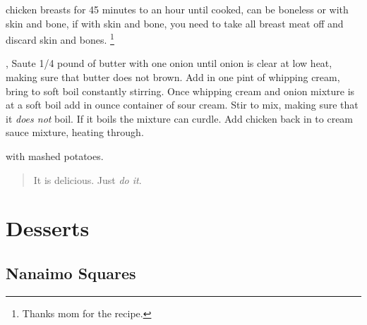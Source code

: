 \documentclass{tufte-book}
\begin{document}

 chicken breasts for 45 minutes to an hour until cooked,
can be boneless or with skin and bone, if with skin and bone, you need to take
all breast meat off and discard skin and bones.  \footnote{Thanks mom for the
recipe.}

, Saute 1/4 pound of butter with one onion until onion
is clear at low heat, making sure that butter does not brown.  Add in one pint
of whipping cream, bring to soft boil constantly stirring. Once whipping cream
and onion mixture is at a soft boil add in  ounce container of sour cream.  Stir to mix, making sure that it \emph{does not} boil. If it boils the mixture can curdle.  Add chicken back in to cream sauce mixture, heating through.

 with mashed potatoes.


\begin{quote}
It is delicious. Just \emph{do it}.
\end{quote}


\chapter{Desserts}

\section{Nanaimo Squares}
\end{document}
